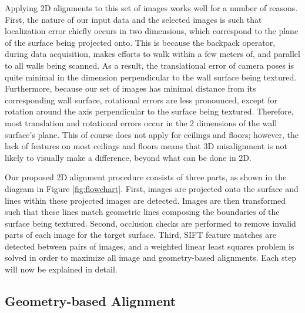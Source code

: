 \documentclass[]{spie}  %
\begin{document}
Applying 2D alignments to this set of images works well for a number
of reasons. First, the nature of our input data and the selected
images is such that localization error chiefly occurs in two
dimensions, which correspond to the plane of the surface being
projected onto. This is because the backpack operator, during data
acquisition, makes efforts to walk within a few meters of, and
parallel to all walls being scanned. As a result, the translational
error of camera poses is quite minimal in the dimension perpendicular
to the wall surface being textured. Furthermore, because our set of
images has minimal distance from its corresponding wall surface,
rotational errors are less pronounced, except for rotation around the
axis perpendicular to the surface being textured. Therefore, most
translation and rotational errors occur in the 2 dimensions of the
wall surface's plane. This of course does not apply for ceilings and
floors; however, the lack of features on most ceilings and floors
means that 3D misalignment is not likely to visually make a
difference, beyond what can be done in 2D.


Our proposed 2D alignment procedure consists of three parts, as shown
in the diagram in Figure \ref{fig:flowchart}. First, images are
projected onto the surface and lines within these projected images are
detected. Images are then transformed such that these lines match
geometric lines composing the boundaries of the surface being
textured. Second, occlusion checks are performed to remove invalid
parts of each image for the target surface. Third, SIFT feature
matches are detected between pairs of images, and a weighted linear
least squares problem is solved in order to maximize all image and
geometry-based alignments. Each step will now be explained in detail.


\subsection{Geometry-based Alignment}
\label{sec:geometryAlignment}
\end{document}
